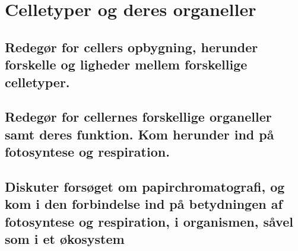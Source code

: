 \newpage
\section{Celletyper og deres organeller}\label{sec:celletyperogderesorganeller}
\subsection{Redegør for cellers opbygning, herunder forskelle og ligheder mellem forskellige celletyper.}

\subsection{Redegør for cellernes forskellige organeller samt deres funktion. Kom herunder ind på fotosyntese og respiration.}

\subsection{Diskuter forsøget om papirchromatografi, og kom i den forbindelse ind på betydningen af fotosyntese og respiration, i organismen, såvel som i et økosystem}

